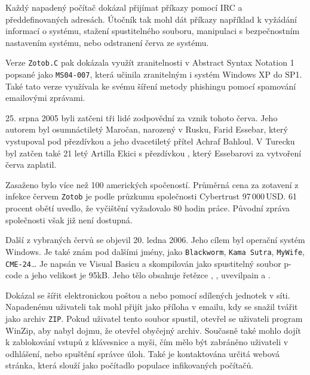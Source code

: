 \documentclass[a4paper,12pt]{article}
\begin{document}
Každý napadený počítač dokázal přijímat příkazy pomocí IRC a předdefinovaných adresách. Útočník tak mohl dát příkazy například k vyžádání informací o systému, stažení spustitelného souboru, manipulaci s bezpečnostním nastavením systému, nebo odstranení červa ze systému.

Verze \texttt{Zotob.C} pak dokázala využít zranitelnosti v Abstract Syntax Notation 1 popsané jako \texttt{MS04-007}, která učinila zranitelným i systém Windows XP do SP1\cite{zotob-msbulletin2}. Také tato verze využívala ke svému šíření metody phishingu pomocí spamování emailovými zprávami.\cite{zotobc-fsecure}

25. srpna 2005 byli zatčeni tři lidé zodpovědní za vznik tohoto červa. Jeho autorem byl osumnáctiletý Maročan, narozený v Rusku, Farid Essebar, který vystupoval pod přezdívkou  a jeho dvacetiletý přítel Achraf Bahloul. V Turecku byl zatčen také 21 letý Artilla Ekici s přezdívkou , který Essebarovi za vytvoření červa zaplatil.\cite{zotob-schneider}\cite{zotob-fbi}

Zasaženo bylo více než 100 amerických spočeností\cite{zotob-fbi}. Průměrná cena za zotavení z infekce červem \texttt{Zotob} je podle průzkumu společnosti Cybertrust 97\,000\,USD. 61 procent obětí uvedlo, že vyčištění vyžadovalo 80 hodin práce.\cite{zotob-wikidot}\cite{zotob-cnet} Původní zpráva společnosti však již není dostupná.

Další z vybraných červů se objevil 20. ledna 2006\cite{nyxem-wiki}. Jeho cílem byl operační systém Windows. Je také znám pod dalšími jmény, jako \texttt{Blackworm}, \texttt{Kama Sutra}, \texttt{MyWife}, \texttt{CME-24}\dots\cite{nyxem-caida} Je napsán ve Visual Basicu a skompilován jako spustitelný soubor p-code a jeho velikost je 95kB. Jeho tělo obsahuje řetězce , , uv{evilpain} a .\cite{nyxem-fsecure} 

Dokázal se šířit elektronickou poštou a nebo pomocí sdílených jednotek v síti. Napadenému uživateli tak mohl přijít jako příloha v emailu, kdy se snažil tvářit jako archiv \texttt{ZIP}. Pokud uživatel tento soubor spustil, otevřel se uživateli program WinZip, aby nabyl dojmu, že otevřel obyčejný archiv\cite{nyxem-trendmicro}. Současně také mohlo dojít k zablokování vstupů z klávesnice a myši, čím mělo být zabráněno uživateli v odhlášení, nebo spuštění správce úloh\cite{nyxem-fsecure}\cite{nyxem-trendmicro}. Také je kontaktována určitá webová stránka, která slouží jako počítadlo populace infikovaných počítačů.
\end{document}
